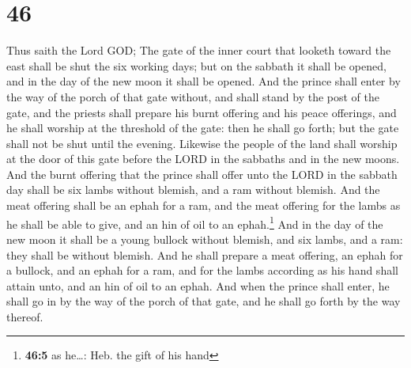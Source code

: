 \hypertarget{section-45}{%
\section{46}\label{section-45}}

 Thus saith the Lord GOD; The gate of the inner court that
looketh toward the east shall be shut the six working days; but on the
sabbath it shall be opened, and in the day of the new moon it shall be
opened.  And the prince shall enter by the way of the
porch of that gate without, and shall stand by the post of the gate, and
the priests shall prepare his burnt offering and his peace offerings,
and he shall worship at the threshold of the gate: then he shall go
forth; but the gate shall not be shut until the evening. 
Likewise the people of the land shall worship at the door of this gate
before the LORD in the sabbaths and in the new moons.  And
the burnt offering that the prince shall offer unto the LORD in the
sabbath day shall be six lambs without blemish, and a ram without
blemish.  And the meat offering shall be an ephah for a
ram, and the meat offering for the lambs as he shall be able to give,
and an hin of oil to an ephah.\footnote{\textbf{46:5} as he\ldots: Heb.
  the gift of his hand}  And in the day of the new moon it
shall be a young bullock without blemish, and six lambs, and a ram: they
shall be without blemish.  And he shall prepare a meat
offering, an ephah for a bullock, and an ephah for a ram, and for the
lambs according as his hand shall attain unto, and an hin of oil to an
ephah.  And when the prince shall enter, he shall go in by
the way of the porch of that gate, and he shall go forth by the way
thereof.

